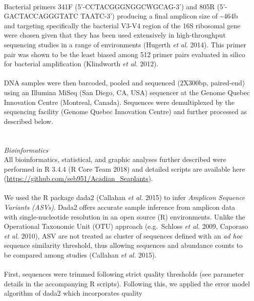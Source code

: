 \documentclass[11pt,]{article}
\begin{document}
\hspace*{0.333em}\\
Bacterial primers 341F (5'-CCTACGGGNGGCWGCAG-3') and 805R
(5'-GACTACCAGGGTATC TAATC-3') producing a final amplicon size of
\textasciitilde{}464b and targeting specifically the bacterial V3-V4
region of the 16S ribosomal gene were chosen given that they has been
used extensively in high-throughput sequencing studies in a range of
environments (Hugerth \emph{et al.} 2014). This primer pair was shown to
be the least biased among 512 primer pairs evaluated in silico for
bacterial amplification (Klindworth \emph{et al.} 2012).\\
\hspace*{0.333em}\\
DNA samples were then barcoded, pooled and sequenced (2X300bp,
paired-end) using an Illumina MiSeq (San Diego, CA, USA) sequencer at
the Genome Quebec Innovation Centre (Montreal, Canada). Sequences were
demultiplexed by the sequencing facility (Genome Quebec Innovation
Centre) and further processed as described below.\\
\hspace*{0.333em}\\
\hspace*{0.333em}\\
\emph{Bioinformatics}\\
All bioinformatics, statistical, and graphic analyses further described
were performed in R 3.4.4 (R Core Team 2018) and detailed scripts are
available here (\url{https://github.com/seb951/Acadian_Seaplants}).\\
\hspace*{0.333em}\\
We used the R package dada2 (Callahan \emph{et al.} 2015) to infer
\emph{Amplicon Sequence Variants (ASVs)}. Dada2 offers accurate sample
inference from amplicon data with single-nucleotide resolution in an
open source (R) environments. Unlike the Operational Taxonomic Unit
(OTU) approach (e.g.~Schloss \emph{et al.} 2009, Caporaso \emph{et al.}
2010), ASV are not treated as cluster of sequences defined with an
\emph{ad hoc} sequence similarity threshold, thus allowing sequences and
abundance counts to be compared among studies (Callahan \emph{et al.}
2015).\\
\hspace*{0.333em}\\
First, sequences were trimmed following strict quality thresholds (see
parameter details in the accompanying R scripts). Following this, we
applied the error model algorithm of dada2 which incorporates quality
\end{document}
